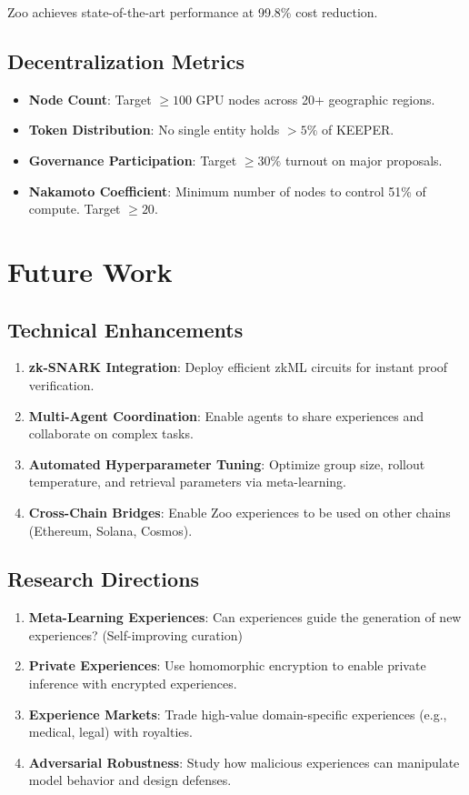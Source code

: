 \documentclass[11pt,a4paper]{article}
\begin{document}
Zoo achieves state-of-the-art performance at 99.8\% cost reduction.

\subsection{Decentralization Metrics}

\begin{itemize}
\item \textbf{Node Count}: Target $\geq 100$ GPU nodes across 20+ geographic regions.
\item \textbf{Token Distribution}: No single entity holds $> 5\%$ of KEEPER.
\item \textbf{Governance Participation}: Target $\geq 30\%$ turnout on major proposals.
\item \textbf{Nakamoto Coefficient}: Minimum number of nodes to control 51\% of compute. Target $\geq 20$.
\end{itemize}

\section{Future Work}

\subsection{Technical Enhancements}

\begin{enumerate}
\item \textbf{zk-SNARK Integration}: Deploy efficient zkML circuits for instant proof verification.
\item \textbf{Multi-Agent Coordination}: Enable agents to share experiences and collaborate on complex tasks.
\item \textbf{Automated Hyperparameter Tuning}: Optimize group size, rollout temperature, and retrieval parameters via meta-learning.
\item \textbf{Cross-Chain Bridges}: Enable Zoo experiences to be used on other chains (Ethereum, Solana, Cosmos).
\end{enumerate}

\subsection{Research Directions}

\begin{enumerate}
\item \textbf{Meta-Learning Experiences}: Can experiences guide the generation of new experiences? (Self-improving curation)
\item \textbf{Private Experiences}: Use homomorphic encryption to enable private inference with encrypted experiences.
\item \textbf{Experience Markets}: Trade high-value domain-specific experiences (e.g., medical, legal) with royalties.
\item \textbf{Adversarial Robustness}: Study how malicious experiences can manipulate model behavior and design defenses.
\end{enumerate}
\end{document}
